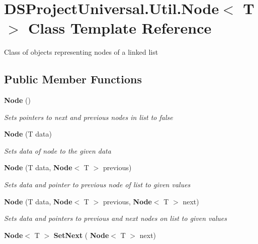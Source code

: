 \section{D\+S\+Project\+Universal.\+Util.\+Node$<$ T $>$ Class Template Reference}
\label{class_d_s_project_universal_1_1_util_1_1_node}


Class of objects representing nodes of a linked list 


\subsection*{Public Member Functions}
\begin{DoxyCompactItemize}
\item 
\mbox{\label{class_d_s_project_universal_1_1_util_1_1_node_a642b6a15d69d74741ebfbed85c6f40bd}} 
\textbf{ Node} ()
\begin{DoxyCompactList}\small\item\em Sets pointers to next and previous nodes in list to false\end{DoxyCompactList}\item 
\mbox{\label{class_d_s_project_universal_1_1_util_1_1_node_a5b3fc6028f3199fe82e1876507dd5c2c}} 
\textbf{ Node} (T data)
\begin{DoxyCompactList}\small\item\em Sets data of node to the given data\end{DoxyCompactList}\item 
\mbox{\label{class_d_s_project_universal_1_1_util_1_1_node_af84b42c7b9dc39eaf0b2f1dc5a1b1a8d}} 
\textbf{ Node} (T data, \textbf{ Node}$<$ T $>$ previous)
\begin{DoxyCompactList}\small\item\em Sets data and pointer to previous node of list to given values\end{DoxyCompactList}\item 
\mbox{\label{class_d_s_project_universal_1_1_util_1_1_node_aa19f0eb3f55f3016aac255cfc0d717e5}} 
\textbf{ Node} (T data, \textbf{ Node}$<$ T $>$ previous, \textbf{ Node}$<$ T $>$ next)
\begin{DoxyCompactList}\small\item\em Sets data and pointers to previous and next nodes on list to given values\end{DoxyCompactList}\item 
\textbf{ Node}$<$ T $>$ \textbf{ Set\+Next} (\textbf{ Node}$<$ T $>$ next)

\end{DoxyCompactItemize}

